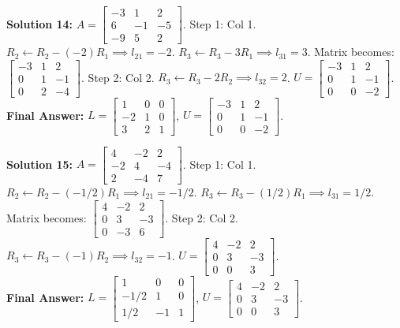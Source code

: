 \documentclass[11pt]{article}
\begin{document}
\vspace{0.5cm}
\textbf{Solution 14:}
$A = \begin{bmatrix} -3 & 1 & 2 \\ 6 & -1 & -5 \\ -9 & 5 & 2 \end{bmatrix}$.
Step 1: Col 1.
$R_2 \leftarrow R_2 - (-2)R_1 \implies l_{21} = -2$.
$R_3 \leftarrow R_3 - 3R_1 \implies l_{31} = 3$.
Matrix becomes: $\begin{bmatrix} -3 & 1 & 2 \\ 0 & 1 & -1 \\ 0 & 2 & -4 \end{bmatrix}$.
Step 2: Col 2.
$R_3 \leftarrow R_3 - 2R_2 \implies l_{32} = 2$.
$U = \begin{bmatrix} -3 & 1 & 2 \\ 0 & 1 & -1 \\ 0 & 0 & -2 \end{bmatrix}$. \\
\textbf{Final Answer:} $L = \begin{bmatrix} 1 & 0 & 0 \\ -2 & 1 & 0 \\ 3 & 2 & 1 \end{bmatrix}$, $U = \begin{bmatrix} -3 & 1 & 2 \\ 0 & 1 & -1 \\ 0 & 0 & -2 \end{bmatrix}$.

\vspace{0.5cm}
\textbf{Solution 15:}
$A = \begin{bmatrix} 4 & -2 & 2 \\ -2 & 4 & -4 \\ 2 & -4 & 7 \end{bmatrix}$.
Step 1: Col 1.
$R_2 \leftarrow R_2 - (-1/2)R_1 \implies l_{21} = -1/2$.
$R_3 \leftarrow R_3 - (1/2)R_1 \implies l_{31} = 1/2$.
Matrix becomes: $\begin{bmatrix} 4 & -2 & 2 \\ 0 & 3 & -3 \\ 0 & -3 & 6 \end{bmatrix}$.
Step 2: Col 2.
$R_3 \leftarrow R_3 - (-1)R_2 \implies l_{32} = -1$.
$U = \begin{bmatrix} 4 & -2 & 2 \\ 0 & 3 & -3 \\ 0 & 0 & 3 \end{bmatrix}$. \\
\textbf{Final Answer:} $L = \begin{bmatrix} 1 & 0 & 0 \\ -1/2 & 1 & 0 \\ 1/2 & -1 & 1 \end{bmatrix}$, $U = \begin{bmatrix} 4 & -2 & 2 \\ 0 & 3 & -3 \\ 0 & 0 & 3 \end{bmatrix}$.
\end{document}
